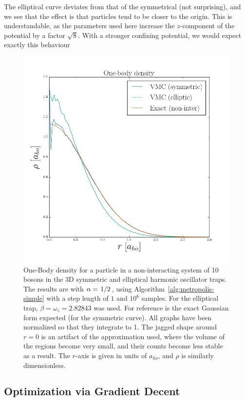 \documentclass[twocolumn]{article}
\begin{document}
The elliptical curve deviates from that of the symmetrical (not surprising), and
we see that the effect is that particles tend to be closer to the origin. This
is understandable, as the parameters used here increase the $z$-component of the
potential by a factor $\sqrt{8}$. With a stronger confining potential, we would
expect exactly this behaviour

\begin{figure}[ht]
    \centering
    \includegraphics[width=0.8\linewidth]{../results/one-body-3D-N10-noniter.png}
    \caption{One-Body density for a particle in a non-interacting system of 10
    bosons in the 3D symmetric and elliptical harmonic oscillator traps. The results are with
    $\alpha=\flatfrac{1}{2}$, using Algorithm~\ref{alg:metropolis-simple} with a
    step length of $1$ and $10^6$ samples. For the elliptical trap,
    $\beta=\omega_z=2.82843$ was used. For reference is the exact Gaussian
    form expected (for the symmetric curve). All graphs have been normalized so that they integrate to 1.
    The jagged shape around $r=0$ is an artifact of the approximation used,
    where the volume of the regions become very small, and their counts become
    less stable as a result. The $r$-axis is given in units of $a_{ho}$, and $\rho$ is
    similarly dimensionless.}
    \label{fig:density-ideal}
\end{figure}

\subsection{Optimization via Gradient Decent}
\end{document}
